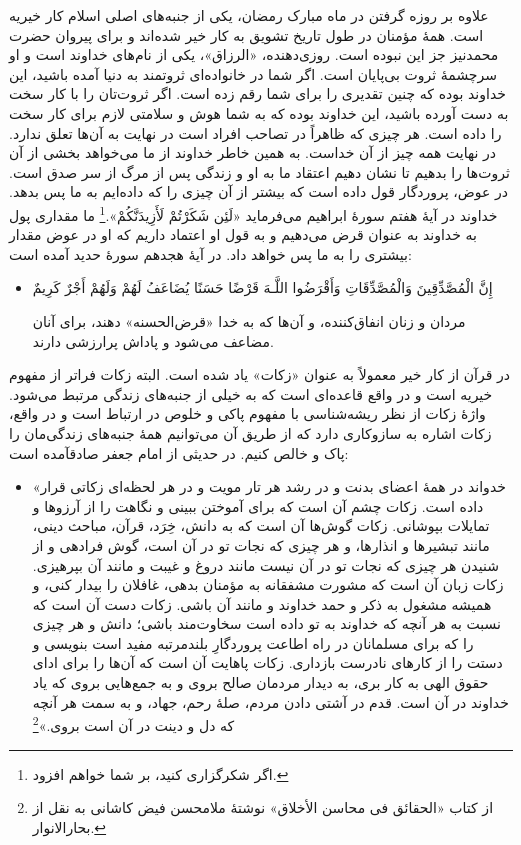 علاوه بر روزه گرفتن در ماه مبارک رمضان، یکی از جنبه‌های اصلی اسلام کار خیریه است. همهٔ‌ مؤمنان در طول تاریخ تشویق به کار خیر شده‌اند و برای پیروان حضرت محمد{}نیز جز این نبوده است. روزی‌دهنده، «الرزاق»، یکی از نام‌های خداوند است و  او سرچشمهٔ ثروت بی‌پایان است. اگر شما در خانواده‌ای ثروتمند به دنیا آمده باشید، این خداوند بوده که چنین تقدیری را برای شما رقم زده است. اگر ثروت‌تان را با کار سخت به دست آورده باشید، این خداوند بوده که به شما هوش و سلامتی لازم برای کار سخت را داده است. هر چیزی که ظاهراً در تصاحب افراد است در نهایت به آن‌ها تعلق ندارد. در نهایت همه چیز از آن خداست. به همین خاطر خداوند از ما می‌خواهد  بخشی از آن ثروت‌ها را بدهیم تا نشان دهیم اعتقاد ما به او و زندگی پس از مرگ از سر صدق است. در عوض، پروردگار قول داده است که بیشتر از آن چیزی را که داده‌ایم به ما پس بدهد. خداوند در آیهٔ هفتم سورهٔ ابراهیم می‌فرماید {«لَئِن شَكَرْتُمْ لَأَزِيدَنَّكُمْ».}\footnote{اگر شکرگزاری کنید، بر شما خواهم افزود.} ما مقداری پول به خداوند به عنوان قرض  می‌دهیم و به قول او اعتماد داریم که او در عوض مقدار بیشتری را به ما پس خواهد داد. در آیهٔ هجدهم سورهٔ حدید آمده است:

\begin{itemize}
	\item[]
	{
		إِنَّ الْمُصَّدِّقِينَ وَالْمُصَّدِّقَاتِ وَأَقْرَضُوا اللَّـهَ قَرْضًا حَسَنًا يُضَاعَفُ لَهُمْ وَلَهُمْ أَجْرٌ كَرِيمٌ}
	
	{
		مردان و زنان انفاق‌کننده، و آن‌ها که به خدا «قرض‌الحسنه» دهند، برای آنان مضاعف می‌شود و پاداش پرارزشی دارند.}
\end{itemize}

در قرآن از کار خیر معمولاً به عنوان «زکات» یاد شده است. البته زکات فراتر از مفهوم خیریه است و در واقع قاعده‌ای است که به خیلی از جنبه‌های زندگی مرتبط می‌شود. واژهٔ زکات از نظر ریشه‌شناسی با مفهوم پاکی و خلوص در ارتباط است و در واقع، زکات اشاره به سازوکاری دارد که از طریق آن می‌توانیم همهٔ‌ جنبه‌های زندگی‌مان را پاک و خالص کنیم.  در حدیثی از امام جعفر صادق{}آمده است:

\begin{itemize}
	\item[]
	
	{
		«خدواند در همهٔ اعضای بدنت و در رشد هر تار مویت و در هر لحظه‌ای زکاتی قرار داده است. زکات چشم آن است که برای آموختن ببینی و نگاهت را از آرزوها و تمایلات بپوشانی. زکات گوش‌ها آن است که به دانش، خِرَد، قرآن، مباحث دینی، مانند تبشیرها و انذارها، و هر چیزی که نجات تو در آن است، گوش فرادهی و از شنیدن هر چیزی که نجات تو در آن نیست مانند دروغ و غیبت و مانند آن بپرهیزی. زکات زبان آن است که مشورت مشفقانه به مؤمنان بدهی، غافلان را بیدار کنی، و همیشه مشغول به ذکر و حمد خداوند و مانند آن باشی. زکات دست آن است که نسبت به هر آنچه که خداوند به تو داده است سخاوت‌مند باشی؛ دانش و هر چیزی را که برای مسلمانان در راه اطاعت پروردگارِ بلندمرتبه مفید است بنویسی و دستت را از کارهای نادرست بازداری. زکات پاهایت آن است که آن‌ها را برای ادای حقوق الهی به کار بری، به دیدار مردمان صالح بروی و به جمع‌هایی بروی که یاد خداوند در آن است. قدم در آشتی دادن مردم، صلهٔ رحم، جهاد، و به سمت هر آنچه که  دل و دینت در آن است بروی.»}\footnote{از کتاب «الحقائق فی محاسن الأخلاق» نوشتهٔ ملامحسن فیض کاشانی به نقل از بحارالانوار.}
\end{itemize}


